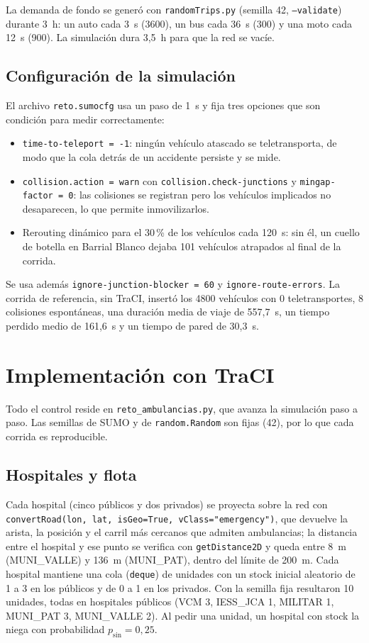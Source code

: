 \documentclass[conference,a4paper]{IEEEtran}
\begin{document}
La demanda de fondo se generó con \texttt{randomTrips.py} (semilla 42,
\texttt{--validate}) durante 3~h: un auto cada 3~s (3600), un bus cada 36~s (300) y una
moto cada 12~s (900). La simulación dura 3,5~h para que la red se vacíe.

\subsection{Configuración de la simulación}
El archivo \texttt{reto.sumocfg} usa un paso de 1~s y fija tres opciones que son
condición para medir correctamente:
\begin{itemize}
\item \texttt{time-to-teleport = -1}: ningún vehículo atascado se teletransporta, de modo
que la cola detrás de un accidente persiste y se mide.
\item \texttt{collision.action = warn} con \texttt{collision.check-junctions} y
\texttt{mingap-factor = 0}: las colisiones se registran pero los vehículos implicados no
desaparecen, lo que permite inmovilizarlos.
\item Rerouting dinámico para el 30\,\% de los vehículos cada 120~s:
sin él, un cuello de botella en Barrial Blanco dejaba 101 vehículos atrapados al final
de la corrida.
\end{itemize}
Se usa además \texttt{ignore-junction-blocker = 60} y \texttt{ignore-route-errors}.
La corrida de referencia, sin TraCI, insertó los 4800 vehículos con 0 teletransportes,
8 colisiones espontáneas, una duración media de viaje de 557,7~s, un tiempo perdido medio
de 161,6~s y un tiempo de pared de 30,3~s.

\section{Implementación con TraCI}
Todo el control reside en \texttt{reto\_ambulancias.py}, que avanza la simulación paso a
paso. Las semillas de SUMO y de \texttt{random.Random} son fijas (42), por lo que cada
corrida es reproducible.

\subsection{Hospitales y flota}
Cada hospital (cinco públicos y dos privados) se proyecta sobre la red con
\texttt{convertRoad(lon, lat, isGeo=True, vClass="emergency")}, que devuelve la arista, la
posición y el carril más cercanos que admiten ambulancias; la distancia entre el hospital
y ese punto se verifica con \texttt{getDistance2D} y queda entre 8~m (MUNI\_VALLE) y
136~m (MUNI\_PAT), dentro del límite de 200~m. Cada hospital mantiene una cola
(\texttt{deque}) de unidades con un stock inicial aleatorio de 1 a 3 en los públicos y de
0 a 1 en los privados. Con la semilla fija resultaron 10 unidades, todas en hospitales
públicos (VCM 3, IESS\_JCA 1, MILITAR 1, MUNI\_PAT 3, MUNI\_VALLE 2). Al pedir una unidad,
un hospital con stock la niega con probabilidad $p_{\mathrm{sin}}=0{,}25$.
\end{document}
